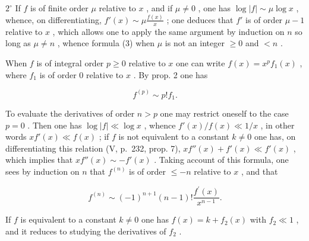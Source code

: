 \(2^{\circ}\) If \(f\) is of finite order \(\mu\) relative to \(x\) , and if \(\mu \neq 0\) , one has \(\log |f| \sim \mu \log x\) , whence, on differentiating, \(f'(x) \sim \mu \frac{f(x)}{x}\) ; one deduces that \(f'\) is of order \(\mu - 1\) relative to \(x\) , which allows one to apply the same argument by induction on \(n\) so long as \(\mu \neq n\) , whence formula (3) when \(\mu\) is not an integer \(\geqslant 0\) and \(< n\) .

When \(f\) is of integral order \(p \geqslant 0\) relative to \(x\) one can write \(f(x) = x^p f_1(x)\) , where \(f_1\) is of order 0 relative to \(x\) . By prop. 2 one has

\[
f ^ {(p)} \sim p! f _ {1}.
\]

To evaluate the derivatives of order \(n > p\) one may restrict oneself to the case \(p = 0\) . Then one has \(\log |f| \ll \log x\) , whence \(f'(x) / f(x) \ll 1 / x\) , in other words \(xf'(x) \ll f(x)\) ; if \(f\) is not equivalent to a constant \(k \neq 0\) one has, on differentiating this relation (V, p.~232, prop. 7), \(xf''(x) + f'(x) \ll f'(x)\) , which implies that \(xf''(x) \sim -f'(x)\) . Taking account of this formula, one sees by induction on \(n\) that \(f^{(n)}\) is of order \(\leqslant -n\) relative to \(x\) , and that

\[
f ^ {(n)} \sim (- 1) ^ {n + 1} (n - 1)! \frac {f ^ {\prime} (x)}{x ^ {n - 1}}.\tag{4}
\]

If \(f\) is equivalent to a constant \(k \neq 0\) one has \(f(x) = k + f_2(x)\) with \(f_2 \ll 1\) , and it reduces to studying the derivatives of \(f_2\) .

